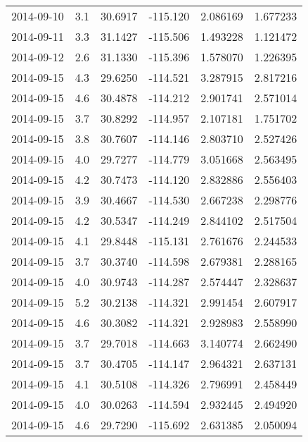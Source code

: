 \begin{tabular}{lrrrrr}
2014-09-10 &       3.1 &  30.6917 &  -115.120 &         2.086169 &         1.677233 \\
2014-09-11 &       3.3 &  31.1427 &  -115.506 &         1.493228 &         1.121472 \\
2014-09-12 &       2.6 &  31.1330 &  -115.396 &         1.578070 &         1.226395 \\
2014-09-15 &       4.3 &  29.6250 &  -114.521 &         3.287915 &         2.817216 \\
2014-09-15 &       4.6 &  30.4878 &  -114.212 &         2.901741 &         2.571014 \\
2014-09-15 &       3.7 &  30.8292 &  -114.957 &         2.107181 &         1.751702 \\
2014-09-15 &       3.8 &  30.7607 &  -114.146 &         2.803710 &         2.527426 \\
2014-09-15 &       4.0 &  29.7277 &  -114.779 &         3.051668 &         2.563495 \\
2014-09-15 &       4.2 &  30.7473 &  -114.120 &         2.832886 &         2.556403 \\
2014-09-15 &       3.9 &  30.4667 &  -114.530 &         2.667238 &         2.298776 \\
2014-09-15 &       4.2 &  30.5347 &  -114.249 &         2.844102 &         2.517504 \\
2014-09-15 &       4.1 &  29.8448 &  -115.131 &         2.761676 &         2.244533 \\
2014-09-15 &       3.7 &  30.3740 &  -114.598 &         2.679381 &         2.288165 \\
2014-09-15 &       4.0 &  30.9743 &  -114.287 &         2.574447 &         2.328637 \\
2014-09-15 &       5.2 &  30.2138 &  -114.321 &         2.991454 &         2.607917 \\
2014-09-15 &       4.6 &  30.3082 &  -114.321 &         2.928983 &         2.558990 \\
2014-09-15 &       3.7 &  29.7018 &  -114.663 &         3.140774 &         2.662490 \\
2014-09-15 &       3.7 &  30.4705 &  -114.147 &         2.964321 &         2.637131 \\
2014-09-15 &       4.1 &  30.5108 &  -114.326 &         2.796991 &         2.458449 \\
2014-09-15 &       4.0 &  30.0263 &  -114.594 &         2.932445 &         2.494920 \\
2014-09-15 &       4.6 &  29.7290 &  -115.692 &         2.631385 &         2.050094 \\

\end{tabular}

